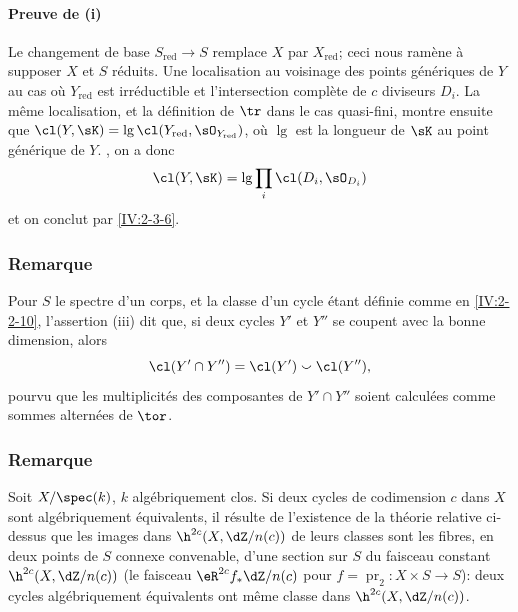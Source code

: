 \paragraph{Preuve de (i)}
Le changement de base $S_\text{red}\to S$ remplace $X$ par $X_\text{red}$; ceci 
nous ramène à supposer $X$ et $S$ réduits. Une localisation au voisinage 
des points génériques de $Y$  au cas où 
$Y_\text{red}$ est irréductible et l'intersection complète de $c$ 
diviseurs $D_i$. La même localisation, et la définition de $\tr$ dans le 
cas quasi-fini, montre ensuite que 
$\cl(Y,\sK)=\operatorname{lg}\cl(Y_\text{red},\sO_{Y_\text{red}})$, où 
$\operatorname{lg}$ est la longueur de $\sK$ au point générique de $Y$. 
, on a donc 
\[
  \cl(Y,\sK) = \operatorname{lg} \prod_i \cl(D_i,\sO_{D_i})
\]
et on conclut par \ref{IV:2-3-6}. 





\subsubsection{Remarque}\label{IV:2-3-9}

Pour $S$ le spectre d'un corps, et la classe d'un cycle étant définie comme 
en \ref{IV:2-2-10}, l'assertion (iii) dit que, si deux cycles $Y'$ et $Y''$ se 
coupent avec la bonne dimension, alors 
\[
  \cl(Y'\cap Y'') = \cl(Y')\smallsmile \cl(Y'')\text{,}
\]
pourvu que les multiplicités des composantes de $Y'\cap Y''$ soient 
calculées comme sommes alternées de $\tor$. 





\subsubsection{Remarque}\label{IV:2-3-10}

Soit $X/\spec(k)$, $k$ algébriquement clos. Si deux cycles de codimension $c$ 
dans $X$ sont algébriquement équivalents, il résulte de l'existence de la 
théorie relative ci-dessus que les images dans $\h^{2 c}(X,\dZ/n(c))$ de 
leurs classes sont les fibres, en deux points de $S$ connexe convenable, d'une 
section sur $S$ du faisceau constant $\h^{2 c}(X,\dZ/n(c))$ (le faisceau 
$\eR^{2 c} f_\ast \dZ/n(c)$ pour $f=\operatorname{pr}_2:X\times S\to S$): deux 
cycles algébriquement équivalents ont même classe dans 
$\h^{2 c}(X,\dZ/n(c))$. 




















